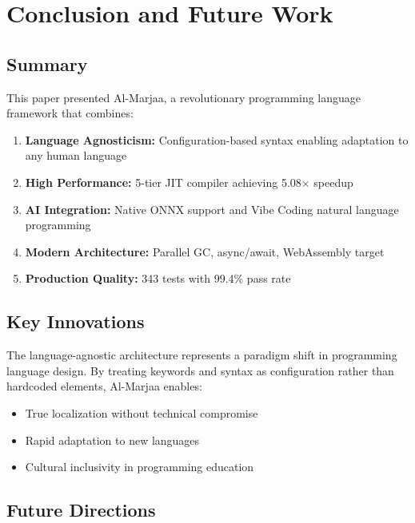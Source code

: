 \documentclass[11pt,a4paper]{article}
\begin{document}
\section{Conclusion and Future Work}
\label{sec:conclusion}

\subsection{Summary}

This paper presented Al-Marjaa, a revolutionary programming language framework that combines:

\begin{enumerate}
    \item \textbf{Language Agnosticism:} Configuration-based syntax enabling adaptation to any human language
    \item \textbf{High Performance:} 5-tier JIT compiler achieving 5.08$\times$ speedup
    \item \textbf{AI Integration:} Native ONNX support and Vibe Coding natural language programming
    \item \textbf{Modern Architecture:} Parallel GC, async/await, WebAssembly target
    \item \textbf{Production Quality:} 343 tests with 99.4\% pass rate
\end{enumerate}

\subsection{Key Innovations}

The language-agnostic architecture represents a paradigm shift in programming language design. By treating keywords and syntax as configuration rather than hardcoded elements, Al-Marjaa enables:

\begin{itemize}
    \item True localization without technical compromise
    \item Rapid adaptation to new languages
    \item Cultural inclusivity in programming education
\end{itemize}

\subsection{Future Directions}
\end{document}

